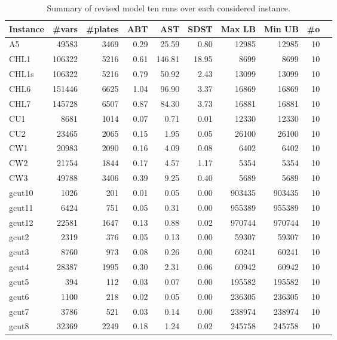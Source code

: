 \documentclass[runningheads]{llncs}
\begin{document}
\begin{table}
\caption{Summary of revised model ten runs over each considered instance.}
\setlength\tabcolsep{2.5px}
\def\arraystretch{1.1}
\begin{tabular}{@{\extracolsep{2pt}}lrrrrrrrrr@{}}
Instance & \#vars & \#plates & ABT & AST & SDST & Max LB & Min UB & \#o\\
\hline
A5 & 49583 & 3469 & 0.29 & 25.59 & 0.80 & 12985 & 12985 & 10 \\
CHL1 & 106322 & 5216 & 0.61 & 146.81 & 18.95 & 8699 & 8699 & 10 \\
CHL1s & 106322 & 5216 & 0.79 & 50.92 & 2.43 & 13099 & 13099 & 10 \\
CHL6 & 151446 & 6625 & 1.04 & 96.90 & 3.37 & 16869 & 16869 & 10 \\
CHL7 & 145728 & 6507 & 0.87 & 84.30 & 3.73 & 16881 & 16881 & 10 \\
CU1 & 8681 & 1014 & 0.07 & 0.71 & 0.01 & 12330 & 12330 & 10 \\
CU2 & 23465 & 2065 & 0.15 & 1.95 & 0.05 & 26100 & 26100 & 10 \\
CW1 & 20983 & 2090 & 0.16 & 4.09 & 0.08 & 6402 & 6402 & 10 \\
CW2 & 21754 & 1844 & 0.17 & 4.57 & 1.17 & 5354 & 5354 & 10 \\
CW3 & 49788 & 3406 & 0.39 & 9.25 & 0.40 & 5689 & 5689 & 10 \\
gcut10 & 1026 & 201 & 0.01 & 0.05 & 0.00 & 903435 & 903435 & 10 \\
gcut11 & 6424 & 751 & 0.05 & 0.31 & 0.00 & 955389 & 955389 & 10 \\
gcut12 & 22581 & 1647 & 0.13 & 0.88 & 0.02 & 970744 & 970744 & 10 \\
gcut2 & 2319 & 376 & 0.05 & 0.13 & 0.00 & 59307 & 59307 & 10 \\
gcut3 & 8760 & 973 & 0.08 & 0.26 & 0.00 & 60241 & 60241 & 10 \\
gcut4 & 28387 & 1995 & 0.30 & 2.31 & 0.06 & 60942 & 60942 & 10 \\
gcut5 & 394 & 112 & 0.03 & 0.07 & 0.00 & 195582 & 195582 & 10 \\
gcut6 & 1100 & 218 & 0.02 & 0.05 & 0.00 & 236305 & 236305 & 10 \\
gcut7 & 3786 & 521 & 0.03 & 0.14 & 0.00 & 238974 & 238974 & 10 \\
gcut8 & 32369 & 2249 & 0.18 & 1.24 & 0.02 & 245758 & 245758 & 10 \\

\end{tabular}
\end{table}
\end{document}
